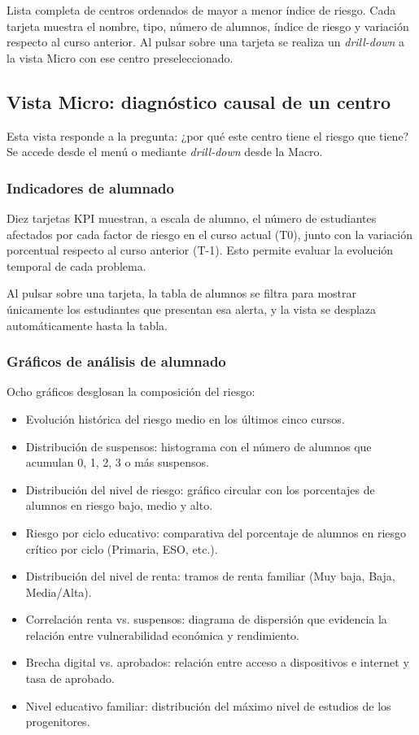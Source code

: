 Lista completa de centros ordenados de mayor a menor índice de riesgo. Cada tarjeta muestra el nombre, tipo, número de alumnos, índice de riesgo y variación respecto al curso anterior. Al pulsar sobre una tarjeta se realiza un \textit{drill-down} a la vista Micro con ese centro preseleccionado.

\subsection{Vista Micro: diagnóstico causal de un centro}

Esta vista responde a la pregunta: ¿por qué este centro tiene el riesgo que tiene? Se accede desde el menú o mediante \textit{drill-down} desde la Macro.

\subsubsection{Indicadores de alumnado}

Diez tarjetas KPI muestran, a escala de alumno, el número de estudiantes afectados por cada factor de riesgo en el curso actual (T0), junto con la variación porcentual respecto al curso anterior (T-1). Esto permite evaluar la evolución temporal de cada problema.

Al pulsar sobre una tarjeta, la tabla de alumnos se filtra para mostrar únicamente los estudiantes que presentan esa alerta, y la vista se desplaza automáticamente hasta la tabla.

\subsubsection{Gráficos de análisis de alumnado}

Ocho gráficos desglosan la composición del riesgo:

\begin{itemize}
    \item Evolución histórica del riesgo medio en los últimos cinco cursos.
    \item Distribución de suspensos: histograma con el número de alumnos que acumulan 0, 1, 2, 3 o más suspensos.
    \item Distribución del nivel de riesgo: gráfico circular con los porcentajes de alumnos en riesgo bajo, medio y alto.
    \item Riesgo por ciclo educativo: comparativa del porcentaje de alumnos en riesgo crítico por ciclo (Primaria, ESO, etc.).
    \item Distribución del nivel de renta: tramos de renta familiar (Muy baja, Baja, Media/Alta).
    \item Correlación renta vs. suspensos: diagrama de dispersión que evidencia la relación entre vulnerabilidad económica y rendimiento.
    \item Brecha digital vs. aprobados: relación entre acceso a dispositivos e internet y tasa de aprobado.
    \item Nivel educativo familiar: distribución del máximo nivel de estudios de los progenitores.
\end{itemize}

